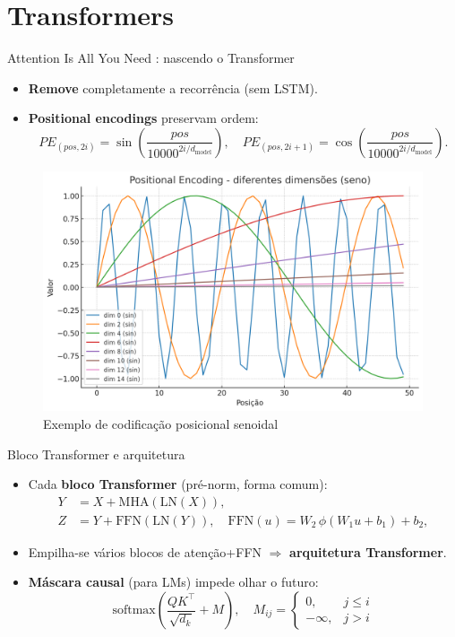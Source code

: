 \documentclass{beamer}
\begin{document}
\section{Transformers}
\begin{frame}{Attention Is All You Need \cite{vaswani2017attention}: nascendo o Transformer}
	\begin{itemize}
		\item \textbf{Remove} completamente a recorrência (sem LSTM).
		\item \textbf{Positional encodings} preservam ordem:
		      \[
			      PE_{(pos,2i)}=\sin\!\left(\frac{pos}{10000^{2i/d_{\text{model}}}}\right),\quad
			      PE_{(pos,2i+1)}=\cos\!\left(\frac{pos}{10000^{2i/d_{\text{model}}}}\right).
		      \]
	\end{itemize}
	\begin{figure}
	\centering
	\includegraphics[height=0.55\textheight,width=0.7\linewidth]{assets/positional-encoding.png}
	\caption{Exemplo de codificação posicional senoidal \cite{vaswani2017attention}}
	\end{figure}	
\end{frame}

\begin{frame}{Bloco Transformer e arquitetura}
	\begin{itemize}
		\item Cada \textbf{bloco Transformer} (pré-norm, forma comum):
		      \[
			      \begin{aligned}
				      Y & = X + \mathrm{MHA}(\mathrm{LN}(X)),                                               \\
				      Z & = Y + \mathrm{FFN}(\mathrm{LN}(Y)),\quad \mathrm{FFN}(u)=W_2\,\phi(W_1u+b_1)+b_2,
			      \end{aligned}
		      \]
		\item Empilha-se vários blocos de atenção+FFN $\Rightarrow$ \textbf{arquitetura Transformer}.
	
		\item \textbf{Máscara causal} (para LMs) impede olhar o futuro:
		\[
			\mathrm{softmax}\!\left(\frac{QK^\top}{\sqrt{d_k}}+M\right),
			\quad
			M_{ij}=\begin{cases}
				0,       & j\le i \\
				-\infty, & j>i
			\end{cases}
		\]
	\end{itemize}
\end{frame}
\end{document}
